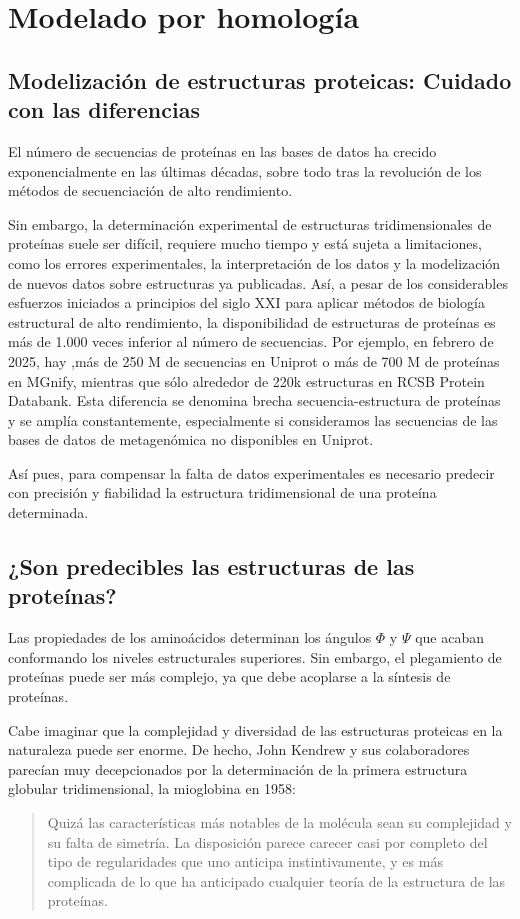 \chapter{Modelado por homología}
\section{Modelización de estructuras proteicas: Cuidado con las diferencias}
El número de secuencias de proteínas en las bases de datos ha crecido exponencialmente en las últimas décadas, sobre todo tras la revolución de los métodos de secuenciación de alto rendimiento.

Sin embargo, la determinación experimental de estructuras tridimensionales de proteínas suele ser difícil, requiere mucho tiempo y está sujeta a limitaciones, como los errores experimentales, la interpretación de los datos y la modelización de nuevos datos sobre estructuras ya publicadas. Así, a pesar de los considerables esfuerzos iniciados a principios del siglo XXI para aplicar métodos de biología estructural de alto rendimiento, la disponibilidad de estructuras de proteínas es más de 1.000 veces inferior al número de secuencias. Por ejemplo, en febrero de 2025, hay ,más de 250 M de secuencias en Uniprot o más de 700 M de proteínas en MGnify, mientras que sólo alrededor de 220k estructuras en RCSB Protein Databank. Esta diferencia se denomina brecha secuencia-estructura de proteínas y se amplía constantemente, especialmente si consideramos las secuencias de las bases de datos de metagenómica no disponibles en Uniprot.

Así pues, para compensar la falta de datos experimentales es necesario predecir con precisión y fiabilidad la estructura tridimensional de una proteína determinada.

\section{¿Son predecibles las estructuras de las proteínas?}
Las propiedades de los aminoácidos determinan los ángulos $\Phi$ y $\Psi$ que acaban conformando los niveles estructurales superiores. Sin embargo, el plegamiento de proteínas puede ser más complejo, ya que debe acoplarse a la síntesis de proteínas.

Cabe imaginar que la complejidad y diversidad de las estructuras proteicas en la naturaleza puede ser enorme. De hecho, John Kendrew y sus colaboradores parecían muy decepcionados por la determinación de la primera estructura globular tridimensional, la mioglobina en 1958:
\begin{quote}
Quizá las características más notables de la molécula sean su complejidad y su falta de simetría. La disposición parece carecer casi por completo del tipo de regularidades que uno anticipa instintivamente, y es más complicada de lo que ha anticipado cualquier teoría de la estructura de las proteínas.
\end{quote}

